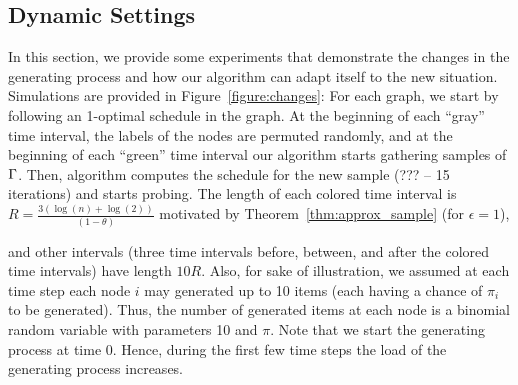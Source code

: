 % 
% 
% 




\subsection{Dynamic Settings}\label{sec:dynset}
In this section, we provide some experiments that demonstrate the changes in the
generating process and how our algorithm can adapt itself to the new situation.
Simulations are provided in Figure~\ref{figure:changes}: For each graph, we
start by following an 1-optimal schedule in the graph. At the beginning of each
``gray'' time interval, the labels of the nodes are permuted randomly, and at
the beginning of each ``green'' time interval our algorithm starts gathering
samples of $\Gamma$. Then, algorithm computes the schedule for the new sample
(??? -- 15 iterations) and starts probing. The length of each colored time
interval is $R = \frac{3(\log(n)+\log(2))}{(1-\theta)}$ motivated by
Theorem~\ref{thm:approx_sample} (for $\epsilon=1$),  



and other intervals (three time intervals before, between, and after the colored time intervals) have length $10R$. Also, for sake of illustration, we assumed at each time step each node $i$ may generated up to 10 items (each having a chance of $\pi_i$ to be generated). Thus, the number of generated items at each node is a binomial random variable with parameters 10 and $\pi$.
Note that we start the generating process at time 0. Hence, during the first few time steps the load of the generating process increases.

